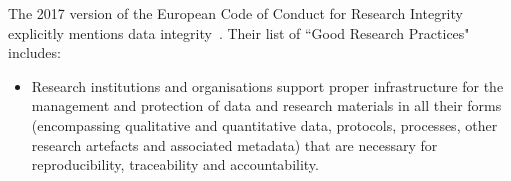 \documentclass{elsarticle}
\begin{document}
The 2017 version of the European Code of Conduct for Research Integrity explicitly mentions data integrity~\cite{eu-code}. 
Their list of ``Good Research Practices" includes:

\begin{itemize}
\item Research institutions and organisations
support proper infrastructure for the
management and protection of data
and research materials in all their forms
(encompassing qualitative and quantitative
data, protocols, processes, other research
artefacts and associated metadata) that are
necessary for reproducibility, traceability
and accountability.
\end{itemize}


\end{document}
